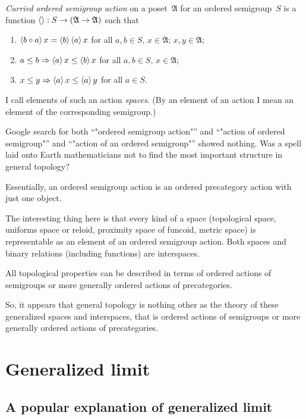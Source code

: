 \documentclass{amsart}
\begin{document}
\begin{defn}
\emph{Curried ordered semigroup action} on a poset~$\mathfrak{A}$ for an ordered semigroup~$S$ is a function $\left\langle \right\rangle:S\to(\mathfrak{A}\to\mathfrak{A})$ such that
\begin{enumerate}
\item $\left\langle b\circ a\right\rangle x = \left\langle b\right\rangle\left\langle a\right\rangle x$ for all $a,b\in S$, $x\in\mathfrak{A}$;
$x,y\in\mathfrak{A}$;
\item $a\leq b\Rightarrow\left\langle a\right\rangle x\leq \left\langle b\right\rangle x$ for all $a,b\in S$, $x\in\mathfrak{A}$;
\item $x\leq y\Rightarrow\left\langle a\right\rangle x\leq \left\langle a\right\rangle y$ for all $a\in S$.
\end{enumerate}
I call elements of such an action \emph{spaces}. (By an element of an action I mean an element of the corresponding semigroup.)
\end{defn}

\begin{rem}
Google search for both ``"ordered semigroup action"'' and ``"action of ordered semigroup"'' and ``"action of an ordered semigroup"'' showed nothing. Was a spell laid onto Earth mathematicians not to find the most important structure in general topology?
\end{rem}

Essentially, an ordered semigroup action is an ordered precategory action with just one object.

The interesting thing here is that every kind of a space
(topological space, uniforms space or reloid, proximity space
of funcoid, metric space) is representable as an element of
an ordered semigroup action. Both spaces and binary relations
(including functions) are interspaces.

All topological properties can be described in terms of
ordered actions of semigroups or more generally ordered actions of precategories.

So, it appears that general topology is nothing other as the
theory of these generalized spaces and interspaces, that is
ordered actions of semigroups or more generally ordered actions of precategories.

\section{Generalized limit}

\subsection{A popular explanation of generalized limit}
\end{document}
